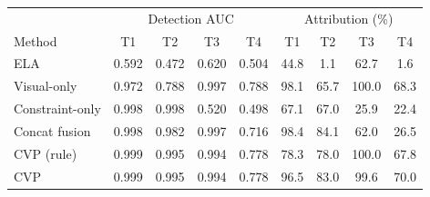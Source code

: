 \begin{tabular}{lcccc|cccc}
\toprule
 & \multicolumn{4}{c|}{Detection AUC} & \multicolumn{4}{c}{Attribution (\%)}\\
Method & T1 & T2 & T3 & T4 & T1 & T2 & T3 & T4\\
\midrule
ELA & 0.592 & 0.472 & 0.620 & 0.504 & 44.8 & 1.1 & 62.7 & 1.6\\
Visual-only & 0.972 & 0.788 & 0.997 & 0.788 & 98.1 & 65.7 & 100.0 & 68.3\\
Constraint-only & 0.998 & 0.998 & 0.520 & 0.498 & 67.1 & 67.0 & 25.9 & 22.4\\
Concat fusion & 0.998 & 0.982 & 0.997 & 0.716 & 98.4 & 84.1 & 62.0 & 26.5\\
CVP (rule) & 0.999 & 0.995 & 0.994 & 0.778 & 78.3 & 78.0 & 100.0 & 67.8\\
CVP & 0.999 & 0.995 & 0.994 & 0.778 & 96.5 & 83.0 & 99.6 & 70.0\\
\bottomrule
\end{tabular}
